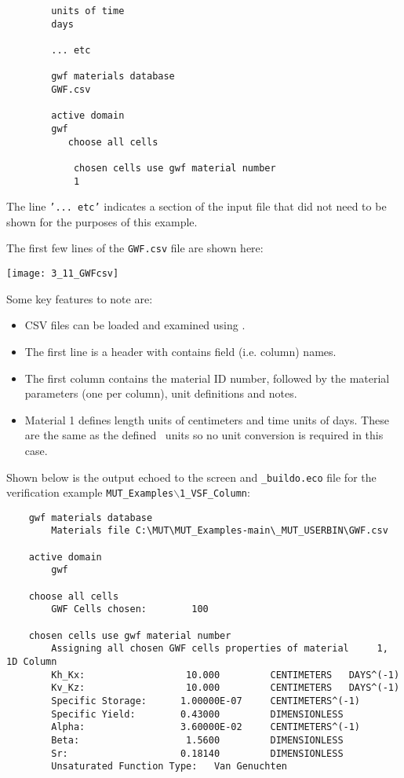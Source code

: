 {\begin{verbatim}
        units of time
        days

        ... etc

        gwf materials database
        GWF.csv

        active domain
        gwf
           choose all cells

            chosen cells use gwf material number
            1
\end{verbatim}
The line \texttt{'...\ etc'} indicates a section of the input file that did not need to be shown for the purposes of this example.

The first few lines of the \texttt{GWF.csv} file are shown here:

    \texttt{[image: 3\_11\_GWFcsv]}

Some key features to note are:
\begin{itemize}
    \item CSV files can be loaded and examined using \excel.
    \item The first line is a header with contains field (i.e. column) names.
    \item The first column contains the material ID number, followed by the material parameters (one per column), unit definitions and notes.
    \item Material 1 defines length units of centimeters and time units of days.  These are the same as the defined \mfus\ units so no unit conversion is required in this case.
\end{itemize}

Shown below is the output echoed to the screen and \texttt{\_buildo.eco} file for the verification example \texttt{MUT\_Examples$\backslash$1\_VSF\_Column}: \begin{verbatim}
    gwf materials database
        Materials file C:\MUT\MUT_Examples-main\_MUT_USERBIN\GWF.csv

    active domain
        gwf

    choose all cells
        GWF Cells chosen:        100

    chosen cells use gwf material number
        Assigning all chosen GWF cells properties of material     1, 1D Column
        Kh_Kx:                  10.000         CENTIMETERS   DAYS^(-1)
        Kv_Kz:                  10.000         CENTIMETERS   DAYS^(-1)
        Specific Storage:      1.00000E-07     CENTIMETERS^(-1)
        Specific Yield:        0.43000         DIMENSIONLESS
        Alpha:                 3.60000E-02     CENTIMETERS^(-1)
        Beta:                   1.5600         DIMENSIONLESS
        Sr:                    0.18140         DIMENSIONLESS
        Unsaturated Function Type:   Van Genuchten


\end{verbatim}}
